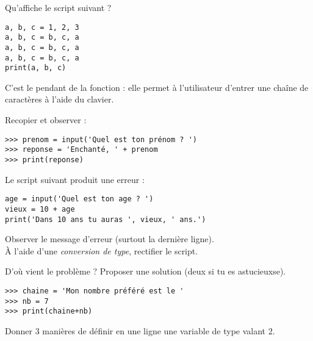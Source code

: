     \begin{exercice}[ : affectations 3]
        Qu'affiche le script suivant ?
        \begin{verbatim}    
a, b, c = 1, 2, 3
a, b, c = b, c, a
a, b, c = b, c, a
a, b, c = b, c, a
print(a, b, c)
        \end{verbatim}
    \end{exercice}

\begin{exercice}

    C'est le pendant de la fonction  : elle permet à l'utilisateur d'entrer une chaîne de caractères à l'aide du clavier.

    Recopier et observer :
\begin{verbatim}
>>> prenom = input('Quel est ton prénom ? ')
>>> reponse = 'Enchanté, ' + prenom
>>> print(reponse)
\end{verbatim}
\end{exercice}

\begin{exercice}

    Le script suivant produit une erreur :
\begin{verbatim}
age = input('Quel est ton age ? ')
vieux = 10 + age
print('Dans 10 ans tu auras ', vieux, ' ans.')
\end{verbatim}
    Observer le message d'erreur (surtout la dernière ligne).\\
    À l'aide d'une \textit{conversion de type}, rectifier le script.
\end{exercice}
\begin{exercice}
D'où vient le problème ? Proposer une solution (deux si tu es astucieu\cdot x\cdot se).
\begin{verbatim}
>>> chaine = 'Mon nombre préféré est le '
>>> nb = 7
>>> print(chaine+nb)
\end{verbatim}
\end{exercice}

\begin{exercice}
    Donner 3 manières de définir en une ligne une variable  de type  valant 2.
\end{exercice}

